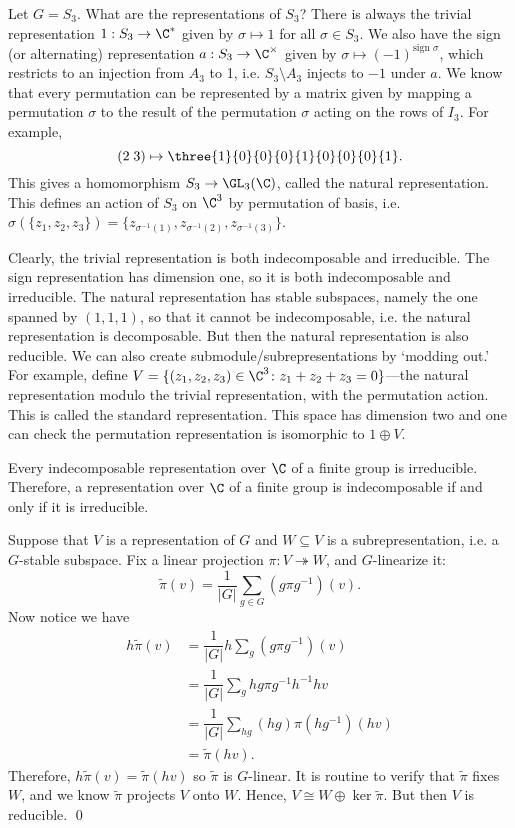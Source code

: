 \begin{ex}
Let $G=S_3$. What are the representations of $S_3$? There is always the trivial representation $1: S_3 \to \C^*$ given by $\sigma \mapsto 1$ for all $\sigma \in S_3$. We also have the sign (or alternating) representation $a: S_3 \to \C^\times$ given by $\sigma \mapsto (-1)^{\text{sign }\sigma}$, which restricts to an injection from $A_3$ to 1, i.e. $S_3 \setminus A_3$ injects to $-1$ under $a$. We know that every permutation can be represented by a matrix given by mapping a permutation $\sigma$ to the result of the permutation $\sigma$ acting on the rows of $I_3$. For example,
	\[
	(2\;3) \mapsto \three{1}{0}{0}{0}{1}{0}{0}{0}{1}.
	\]
This gives a homomorphism $S_3 \to \GL_3(\C)$, called the natural representation. This defines an action of $S_3$ on $\C^3$ by permutation of basis, i.e. $\sigma(\{z_1,z_2,z_3\})= \{z_{\sigma^{-1}(1)}, z_{\sigma^{-1}(2)}, z_{\sigma^{-1}(3)}\}$. 

Clearly, the trivial representation is both indecomposable and irreducible. The sign representation has dimension one, so it is both indecomposable and irreducible. The natural representation has stable subspaces, namely the one spanned by $(1,1,1)$, so that it cannot be indecomposable, i.e. the natural representation is decomposable. But then the natural representation is also reducible. We can also create submodule/subrepresentations by `modding out.' For example, define $V=\{ (z_1,z_2,z_3) \in \C^3 \colon z_1+z_2+z_3=0\}$---the natural representation modulo the trivial representation, with the permutation action. This is called the standard representation. This space has dimension two and one can check the permutation representation is isomorphic to $1 \oplus V$. \xqed
\end{ex}


\begin{thm}
Every indecomposable representation over $\C$ of a finite group is irreducible. Therefore, a representation over $\C$ of a finite group is indecomposable if and only if it is irreducible.
\end{thm}

\pf Suppose that $V$ is a representation of $G$ and $W \subseteq V$ is a subrepresentation, i.e. a $G$-stable subspace. Fix a linear projection $\pi: V \twoheadrightarrow W$, and $G$-linearize it:
	\[
	\widetilde{\pi}(v) = \dfrac{1}{|G|} \sum_{g \in G} (g\pi g^{-1})(v).
	\]
Now notice we have
	\[
	\begin{split}
	h\widetilde{\pi}(v)&= \dfrac{1}{|G|}h \sum_g (g\pi g^{-1})(v) \\
	&= \dfrac{1}{|G|} \sum_g hg\pi g^{-1}h^{-1}hv \\
	&= \dfrac{1}{|G|} \sum_{hg} (hg)\pi(hg^{-1})(hv) \\
	&= \widetilde{\pi}(hv).
	\end{split}
	\]
Therefore, $h\widetilde{\pi}(v)=\widetilde{\pi}(hv)$ so $\widetilde{\pi}$ is $G$-linear. It is routine to verify that $\widetilde{\pi}$ fixes $W$, and we know $\widetilde{\pi}$ projects $V$ onto $W$. Hence, $V \cong W \oplus \ker \widetilde{\pi}$. But then $V$ is reducible. \qed \\


